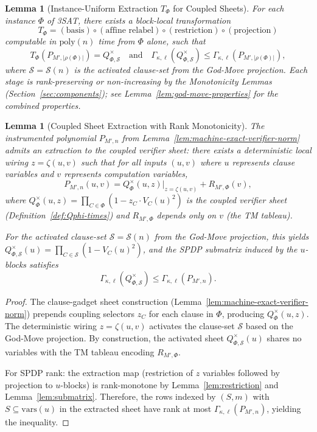\documentclass[12pt]{article}
\newtheorem{lemma}[theorem]{Lemma}
\theoremstyle{definition}
\theoremstyle{definition}
\theoremstyle{remark}
\theoremstyle{remark}
\begin{document}
\begin{lemma}[Instance-Uniform Extraction $T_\Phi$ for Coupled Sheets]\label{lem:instance-uniform-extraction}
For each instance $\Phi$ of 3SAT, there exists a block-local transformation
\[
T_\Phi = (\text{basis}) \circ (\text{affine relabel}) \circ (\text{restriction}) \circ (\text{projection})
\]
computable in $\mathrm{poly}(n)$ time from $\Phi$ alone, such that
\[
T_\Phi(P_{M',|\rho(\Phi)|}) = Q_{\Phi,\mathcal{S}}^{\times} \quad\text{and}\quad \Gamma_{\kappa,\ell}(Q_{\Phi,\mathcal{S}}^{\times}) \leq \Gamma_{\kappa,\ell}(P_{M',|\rho(\Phi)|}),
\]
where $\mathcal{S}=\mathcal{S}(n)$ is the activated clause-set from the God-Move projection.
Each stage is rank-preserving or non-increasing by the Monotonicity Lemmas (Section~\ref{sec:components}); see Lemma~\ref{lem:god-move-properties} for the combined properties.
\end{lemma}

\begin{lemma}[Coupled Sheet Extraction with Rank Monotonicity]\label{lem:coupled-sheet-extraction}
The instrumented polynomial $P_{M',n}$ from Lemma~\ref{lem:machine-exact-verifier-norm} admits an extraction to the coupled verifier sheet: there exists a deterministic local wiring $z=\zeta(u,v)$ such that for all inputs $(u, v)$ where $u$ represents clause variables and $v$ represents computation variables,
\[
P_{M',n}(u, v) = Q_\Phi^{\times}(u,z)\Big|_{z=\zeta(u,v)} + R_{M',\Phi}(v),
\]
where $Q_\Phi^{\times}(u,z) = \prod_{C\in\Phi}(1-z_C \cdot V_C(u)^2)$ is the coupled verifier sheet (Definition~\ref{def:Qphi-times}) and $R_{M',\Phi}$ depends only on $v$ (the TM tableau).

For the activated clause-set $\mathcal{S}=\mathcal{S}(n)$ from the God-Move projection, this yields $Q_{\Phi,\mathcal{S}}^{\times}(u) = \prod_{C\in\mathcal{S}}(1-V_C(u)^2)$, and the SPDP submatrix induced by the $u$-blocks satisfies
\[
\Gamma_{\kappa,\ell}(Q_{\Phi,\mathcal{S}}^{\times}) \leq \Gamma_{\kappa,\ell}(P_{M',n}).
\]
\end{lemma}

\begin{proof}
The clause-gadget sheet construction (Lemma~\ref{lem:machine-exact-verifier-norm}) prepends coupling selectors $z_C$ for each clause in $\Phi$, producing $Q_\Phi^{\times}(u,z)$. The deterministic wiring $z=\zeta(u,v)$ activates the clause-set $\mathcal{S}$ based on the God-Move projection. By construction, the activated sheet $Q_{\Phi,\mathcal{S}}^{\times}(u)$ shares no variables with the TM tableau encoding $R_{M',\Phi}$.

For SPDP rank: the extraction map (restriction of $z$ variables followed by projection to $u$-blocks) is rank-monotone by Lemma~\ref{lem:restriction} and Lemma~\ref{lem:submatrix}. Therefore, the rows indexed by $(S, m)$ with $S \subseteq \mathrm{vars}(u)$ in the extracted sheet have rank at most $\Gamma_{\kappa,\ell}(P_{M',n})$, yielding the inequality.
\end{proof}
\end{document}
